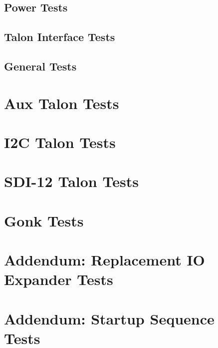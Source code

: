 \documentclass[10pt,letterpaper,titlepage]{report}
\begin{document}
\section{Power Tests}


\section{Talon Interface Tests}


\section{General Tests}


\chapter{Aux Talon Tests}


\chapter{I2C Talon Tests}


\chapter{SDI-12 Talon Tests}


\chapter{Gonk Tests}


\chapter{Addendum: Replacement IO Expander Tests}


\chapter{Addendum: Startup Sequence Tests}

\end{document}
